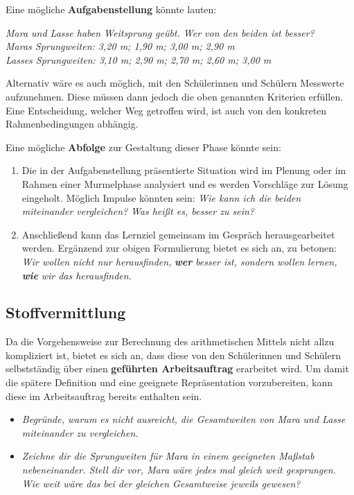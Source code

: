 \documentclass[
]{scrbook}
\providecommand{\tightlist}{%
  \setlength{\itemsep}{0pt}\setlength{\parskip}{0pt}}
\theoremstyle{definition}
\theoremstyle{definition}
\theoremstyle{definition}
\theoremstyle{definition}
\theoremstyle{remark}
\begin{document}
Eine mögliche \textbf{Aufgabenstellung} könnte lauten:

\emph{Mara und Lasse haben Weitsprung geübt. Wer von den beiden ist besser?}\\
\emph{Maras Sprungweiten: 3,20 m; 1,90 m; 3,00 m; 2,90 m}\\
\emph{Lasses Sprungweiten: 3,10 m; 2,90 m; 2,70 m; 2,60 m; 3,00 m}

Alternativ wäre es auch möglich, mit den Schülerinnen und Schülern Messwerte aufzunehmen. Diese müssen dann jedoch die oben genannten Kriterien erfüllen. Eine Entscheidung, welcher Weg getroffen wird, ist auch von den konkreten Rahmenbedingungen abhängig.

Eine mögliche \textbf{Abfolge} zur Gestaltung dieser Phase könnte sein:

\begin{enumerate}
\def\labelenumi{\arabic{enumi}.}
\tightlist
\item
  Die in der Aufgabenstellung präsentierte Situation wird im Plenung oder im Rahmen einer Murmelphase analysiert und es werden Vorschläge zur Lösung eingeholt. Möglich Impulse könnten sein: \emph{Wie kann ich die beiden miteinander vergleichen?} \emph{Was heißt es, besser zu sein?}
\item
  Anschließend kann das Lernziel gemeinsam im Gespräch herausgearbeitet werden. Ergänzend zur obigen Formulierung bietet es sich an, zu betonen: \emph{Wir wollen nicht nur herausfinden,} \textbf{\emph{wer}} \emph{besser ist, sondern wollen lernen,} \textbf{\emph{wie}} \emph{wir das herausfinden.}
\end{enumerate}

\subsection{Stoffvermittlung}\label{stoffvermittlung}

Da die Vorgehensweise zur Berechnung des arithmetischen Mittels nicht allzu kompliziert ist, bietet es sich an, dass diese von den Schülerinnen und Schülern selbstständig über einen \textbf{geführten Arbeitsauftrag} erarbeitet wird. Um damit die spätere Definition und eine geeignete Repräsentation vorzubereiten, kann diese im Arbeitsauftrag bereits enthalten sein.

\begin{itemize}
\tightlist
\item
  \emph{Begründe, warum es nicht ausreicht, die Gesamtweiten von Mara und Lasse miteinander zu vergleichen.}\\
\item
  \emph{Zeichne dir die Sprungweiten für Mara in einem geeigneten Maßstab nebeneinander. Stell dir vor, Mara wäre jedes mal gleich weit gesprungen. Wie weit wäre das bei der gleichen Gesamtweise jeweils gewesen?}
\end{itemize}
\end{document}
